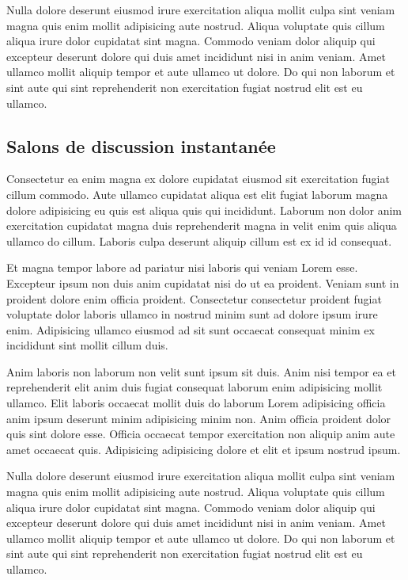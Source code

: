 \documentclass[a4paper,10pt,french]{sphinxmanual}
\begin{document}
Nulla dolore deserunt eiusmod irure exercitation aliqua mollit culpa sint veniam magna quis enim mollit adipisicing aute nostrud. Aliqua voluptate quis cillum aliqua irure dolor cupidatat sint magna. Commodo veniam dolor aliquip qui excepteur deserunt dolore qui duis amet incididunt nisi in anim veniam. Amet ullamco mollit aliquip tempor et aute ullamco ut dolore. Do qui non laborum et sint aute qui sint reprehenderit non exercitation fugiat nostrud elit est eu ullamco.


\subsection{Salons de discussion instantanée}
\label{\detokenize{docs/refs/autocad-help:salons-de-discussion-instantanee}}
Consectetur ea enim magna ex dolore cupidatat eiusmod sit exercitation fugiat cillum commodo. Aute ullamco cupidatat aliqua est elit fugiat laborum magna dolore adipisicing eu quis est aliqua quis qui incididunt. Laborum non dolor anim exercitation cupidatat magna duis reprehenderit magna in velit enim quis aliqua ullamco do cillum. Laboris culpa deserunt aliquip cillum est ex id id consequat.

Et magna tempor labore ad pariatur nisi laboris qui veniam Lorem esse. Excepteur ipsum non duis anim cupidatat nisi do ut ea proident. Veniam sunt in proident dolore enim officia proident. Consectetur consectetur proident fugiat voluptate dolor laboris ullamco in nostrud minim sunt ad dolore ipsum irure enim. Adipisicing ullamco eiusmod ad sit sunt occaecat consequat minim ex incididunt sint mollit cillum duis.

Anim laboris non laborum non velit sunt ipsum sit duis. Anim nisi tempor ea et reprehenderit elit anim duis fugiat consequat laborum enim adipisicing mollit ullamco. Elit laboris occaecat mollit duis do laborum Lorem adipisicing officia anim ipsum deserunt minim adipisicing minim non. Anim officia proident dolor quis sint dolore esse. Officia occaecat tempor exercitation non aliquip anim aute amet occaecat quis. Adipisicing adipisicing dolore et elit et ipsum nostrud ipsum.

Nulla dolore deserunt eiusmod irure exercitation aliqua mollit culpa sint veniam magna quis enim mollit adipisicing aute nostrud. Aliqua voluptate quis cillum aliqua irure dolor cupidatat sint magna. Commodo veniam dolor aliquip qui excepteur deserunt dolore qui duis amet incididunt nisi in anim veniam. Amet ullamco mollit aliquip tempor et aute ullamco ut dolore. Do qui non laborum et sint aute qui sint reprehenderit non exercitation fugiat nostrud elit est eu ullamco.
\end{document}
